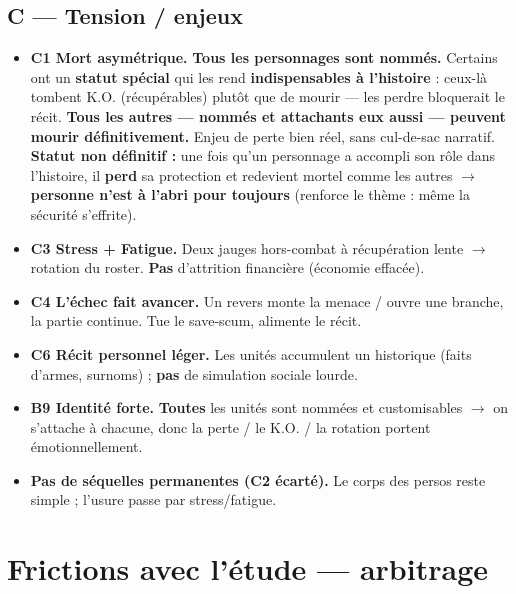 \documentclass[11pt,a4paper]{article}
\begin{document}
\subsection{C --- Tension / enjeux}
\begin{itemize}
\item \textbf{C1 Mort asymétrique.} \textbf{Tous les personnages sont nommés.} Certains ont un \textbf{statut spécial} qui les rend \textbf{indispensables à l'histoire} : ceux-là tombent K.O. (récupérables) plutôt que de mourir --- les perdre bloquerait le récit. \textbf{Tous les autres --- nommés et attachants eux aussi --- peuvent mourir définitivement.} Enjeu de perte bien réel, sans cul-de-sac narratif. \textbf{Statut non définitif :} une fois qu'un personnage a accompli son rôle dans l'histoire, il \textbf{perd} sa protection et redevient mortel comme les autres $\rightarrow$ \textbf{personne n'est à l'abri pour toujours} (renforce le thème : même la sécurité s'effrite).
\item \textbf{C3 Stress + Fatigue.} Deux jauges hors-combat à récupération lente $\rightarrow$ rotation du roster. \textbf{Pas} d'attrition financière (économie effacée).
\item \textbf{C4 L'échec fait avancer.} Un revers monte la menace / ouvre une branche, la partie continue. Tue le save-scum, alimente le récit.
\item \textbf{C6 Récit personnel léger.} Les unités accumulent un historique (faits d'armes, surnoms) ; \textbf{pas} de simulation sociale lourde.
\item \textbf{B9 Identité forte.} \textbf{Toutes} les unités sont nommées et customisables $\rightarrow$ on s'attache à chacune, donc la perte / le K.O. / la rotation portent émotionnellement.
\item \textbf{Pas de séquelles permanentes (C2 écarté).} Le corps des persos reste simple ; l'usure passe par stress/fatigue.
\end{itemize}

\section{Frictions avec l'étude --- arbitrage}
\end{document}
